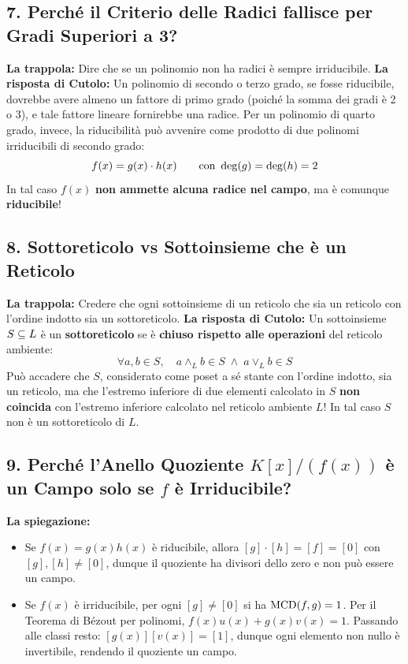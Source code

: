 \subsection{7. Perché il Criterio delle Radici fallisce per Gradi Superiori a 3?}
\textbf{La trappola:} Dire che se un polinomio non ha radici è sempre irriducibile.
\textbf{La risposta di Cutolo:} Un polinomio di secondo o terzo grado, se fosse riducibile, dovrebbe avere almeno un fattore di primo grado (poiché la somma dei gradi è 2 o 3), e tale fattore lineare fornirebbe una radice.
Per un polinomio di quarto grado, invece, la riducibilità può avvenire come prodotto di due polinomi irriducibili di secondo grado:
\[
    f(x) = g(x) \cdot h(x) \qquad \text{con } \operatorname{deg}(g) = \operatorname{deg}(h) = 2
\]
In tal caso $f(x)$ \textbf{non ammette alcuna radice nel campo}, ma è comunque \textbf{riducibile}!

\subsection{8. Sottoreticolo vs Sottoinsieme che è un Reticolo}
\textbf{La trappola:} Credere che ogni sottoinsieme di un reticolo che sia un reticolo con l'ordine indotto sia un sottoreticolo.
\textbf{La risposta di Cutolo:} Un sottoinsieme $S \subseteq L$ è un \textbf{sottoreticolo} se è \textbf{chiuso rispetto alle operazioni} del reticolo ambiente:
\[
    \forall a, b \in S, \quad a \wedge_L b \in S \;\wedge\; a \vee_L b \in S
\]
Può accadere che $S$, considerato come poset a sé stante con l'ordine indotto, sia un reticolo, ma che l'estremo inferiore di due elementi calcolato in $S$ \textbf{non coincida} con l'estremo inferiore calcolato nel reticolo ambiente $L$! In tal caso $S$ non è un sottoreticolo di $L$.

\subsection{9. Perché l'Anello Quoziente $K[x]/(f(x))$ è un Campo solo se $f$ è Irriducibile?}
\textbf{La spiegazione:}
\begin{itemize}
    \item Se $f(x) = g(x)h(x)$ è riducibile, allora $[g] \cdot [h] = [f] = [0]$ con $[g], [h] \neq [0]$, dunque il quoziente ha divisori dello zero e non può essere un campo.
    \item Se $f(x)$ è irriducibile, per ogni $[g] \neq [0]$ si ha $\operatorname{MCD}(f, g) = 1$. Per il Teorema di Bézout per polinomi, $f(x)u(x) + g(x)v(x) = 1$. Passando alle classi resto: $[g(x)][v(x)] = [1]$, dunque ogni elemento non nullo è invertibile, rendendo il quoziente un campo.
\end{itemize}

